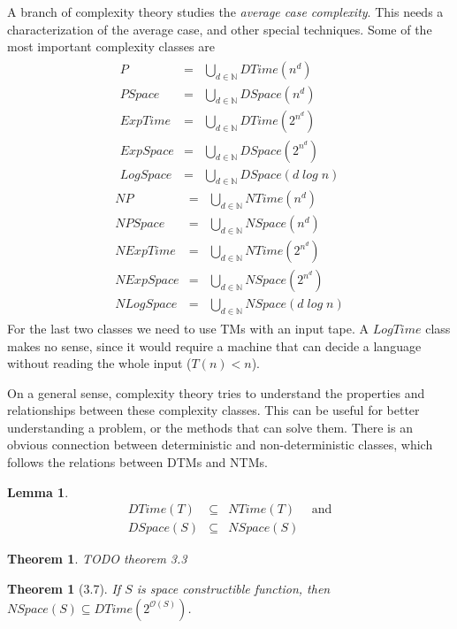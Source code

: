 \documentclass{report}
\newcommand{\NSpace}{\text{$\mathit{NSpace}$}}
\newcommand{\DTime}{\text{$\mathit{DTime}$}}
\newcommand{\bigO}{\text{$\mathcal{O}$}}
\newtheorem{theorem}[definition]{Theorem}
\newtheorem{lemma}[definition]{Lemma}
\begin{document}
A branch of complexity theory studies the \textit{average case complexity}. This needs a characterization of the average case, and other special techniques. Some of the most important complexity classes are
\[
\begin{array}{c}
	\begin{array}{rll}
		P &= &\bigcup_{d\in\mathbb{N}}DTime(n^d)\\
		PSpace &= &\bigcup_{d\in\mathbb{N}}DSpace(n^d)\\
		ExpTime &= &\bigcup_{d\in\mathbb{N}}DTime(2^{n^d})\\
		ExpSpace &= &\bigcup_{d\in\mathbb{N}}DSpace(2^{n^d})\\
		LogSpace &= &\bigcup_{d\in\mathbb{N}}DSpace(d\;log\;n)
	\end{array}
	\begin{array}{rll}
		NP &= &\bigcup_{d\in\mathbb{N}}NTime(n^d)\\
		NPSpace &= &\bigcup_{d\in\mathbb{N}}NSpace(n^d)\\
		NExpTime &= &\bigcup_{d\in\mathbb{N}}NTime(2^{n^d})\\
		NExpSpace &= &\bigcup_{d\in\mathbb{N}}NSpace(2^{n^d})\\
		NLogSpace &= &\bigcup_{d\in\mathbb{N}}NSpace(d\;log\;n)
	\end{array}
\end{array}
\]
For the last two classes we need to use TMs with an input tape. A $LogTime$ class makes no sense, since it would require a machine that can decide a language without reading the whole input ($T(n) < n$).

On a general sense, complexity theory tries to understand the properties and relationships between these complexity classes. This can be useful for better understanding a problem, or the methods that can solve them. There is an obvious connection between deterministic and non-deterministic classes, which follows the relations between DTMs and NTMs.

\begin{lemma}
\[
\begin{array}{rll}
	DTime(T) &\subseteq &NTime(T)\quad\text{ and}\\
	DSpace(S) &\subseteq &NSpace(S)
\end{array}
\]
\end{lemma}

\begin{theorem}TODO theorem 3.3
\end{theorem}

\begin{theorem}[3.7]If $S$ is space constructible function, then $\NSpace(S) \subseteq \DTime(2^{\bigO(S)})$.
\end{theorem}
\end{document}
